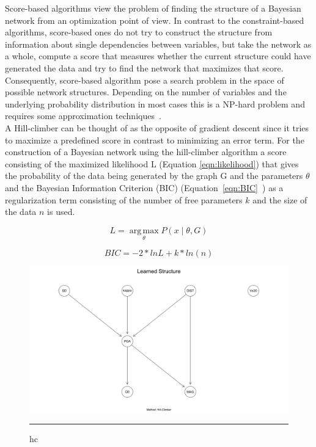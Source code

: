 Score-based algorithms view the problem of finding the structure of a Bayesian network from an optimization point of view. In contrast to the constraint-based algorithms, score-based ones do not try to construct the structure from information about single dependencies between variables, but take the network as a whole, compute a score that measures whether the current structure could have generated the data and try to find the network that maximizes that score. Consequently, score-based algorithm pose a search problem in the space of possible network structures. Depending on the number of variables and the underlying probability distribution in most cases this is a NP-hard problem and requires some approximation techniques~\citep{koller2009}.\\
A Hill-climber can be thought of as the opposite of gradient descent since it tries to maximize a predefined score in contrast to minimizing an error term. For the construction of a Bayesian network using the hill-climber algorithm a score consisting of the maximized likelihood L (Equation \ref{eqn:likelihood}) that gives the probability of the data being generated by the graph G and the parameters $\theta$ and the Bayesian Information Criterion (BIC) (Equation~\ref{eqn:BIC}~\citep{schwarz}) as a regularization term consisting of the number of free parameters $k$ and the size of the data $n$ is used.

\begin{equation}
L = \operatorname*{arg\,max}_\theta P(x\mid \theta, G)
\label{eqn:likelihood}
\end{equation}

\begin{equation}
BIC = -2*ln L + k* ln(n)
\label{eqn:BIC}
\end{equation}


\begin{figure}[htbp]%
	\centering
		\includegraphics[scale=0.33]{Figures/hc_one.pdf}
		\rule{35em}{0.5pt}
	\caption[Score-based Hill-Climber Network]{hc}
	\label{fig:hc}
\end{figure}

